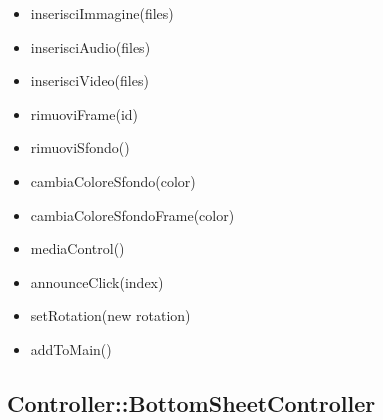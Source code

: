 {{\begin{itemize}
					\item inserisciImmagine(files)
					\item inserisciAudio(files)
					\item inserisciVideo(files)
					\item rimuoviFrame(id)
					\item rimuoviSfondo()
					\item cambiaColoreSfondo(color)
					\item cambiaColoreSfondoFrame(color)
					\item mediaControl()
					\item announceClick(index)
					\item setRotation(new rotation)
					\item addToMain()
					\end{itemize}
				}
				\subsection{Controller::BottomSheetController}
				}